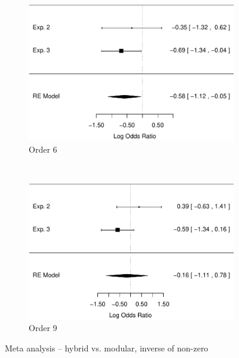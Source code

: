 \documentclass[man,10pt]{apa6}
\begin{document}
\begin{figure}
\centering
\begin{subfigure}[c]{0.4\textwidth}
\centering
\includegraphics[width=\textwidth]{figures/meta/question_typeinverse_nonzero_6_conditionhybrid.pdf}
\caption{Order 6}
\end{subfigure}
~
\begin{subfigure}[c]{0.4\textwidth}
\centering
\includegraphics[width=\textwidth]{figures/meta/question_typeinverse_nonzero_9_conditionhybrid.pdf}
\caption{Order 9}
\end{subfigure}
\caption{Meta analysis -- hybrid vs. modular, inverse of non-zero}
\label{meta_inNZ_h}
\end{figure}\noindent 
\end{document}
